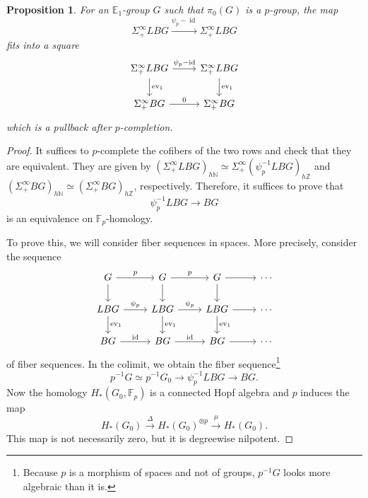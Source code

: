 \documentclass[10pt, oneside]{memoir}
\newtheorem{prop}[thm]{Proposition}
\theoremstyle{definition}
\theoremstyle{remark}
\theoremstyle{plain}
\theoremstyle{definition}
\theoremstyle{remark}
\newcommand{\N}{\mathbb{N}}
\newcommand{\Z}{\mathbb{Z}}
\newcommand{\E}{\mathbb{E}}
\newcommand{\F}{\mathbb{F}}
\newcommand{\on}[1]{\operatorname{#1}}
\newcommand{\1}{\mathbf{1}}
\newcommand{\2}{\mathbf{2}}
\newcommand{\3}{\mathbf{3}}
\DeclareMathOperator{\ev}{ev}
\begin{document}
\begin{prop}
    For an \(\E_1 \)-group \(G \) such that \(\pi_0(G) \) is a \(p \)-group, the map
    \[ \Sigma_+^{\infty} LBG \xrightarrow{\psi_p - \on{id}} \Sigma_+^{\infty} LBG \]
    fits into a square
    \begin{equation*}
    \begin{tikzcd}
        \Sigma_+^{\infty} LBG \ar{r}{\psi_p - \on{id}} \ar{d}{\ev_1} & \Sigma_+^{\infty} LBG \ar{d}{\ev_1} \\
        \Sigma_+^{\infty} BG \ar{r}{0} & \Sigma_+^{\infty} BG
    \end{tikzcd}
    \end{equation*}
    which is a pullback after \(p \)-completion.
\end{prop}

\begin{proof}
    It suffices to \(p \)-complete the cofibers of the two rows and check that they are equivalent. They are given by \((\Sigma_+^{\infty} LBG)_{h\N} \simeq \Sigma_+^{\infty} (\psi_p^{-1} LBG)_{h\Z} \) and \((\Sigma_+^{\infty} BG)_{h\N} \simeq (\Sigma_+^{\infty} BG)_{h\Z} \), respectively. Therefore, it suffices to prove that
    \[ \psi_p^{-1} LBG \to BG \]
    is an equivalence on \(\F_p \)-homology.

    To prove this, we will consider fiber sequences in spaces. More precisely, consider the sequence
    \begin{equation*}
    \begin{tikzcd}
        G \ar{r}{p} \ar{d} & G \ar{r}{p} \ar{d} & G \ar{r} \ar{d} & \cdots \\
        LBG \ar{r}{\psi_p} \ar{d}{\ev_1} & LBG \ar{r}{\psi_p} \ar{d}{\ev_1} & LBG \ar{r} \ar{d}{\ev_1} & \cdots \\
        BG \ar{r}{\on{id}} & BG \ar{r}{\on{id}}  & BG \ar{r} & \cdots
    \end{tikzcd}
    \end{equation*}
    of fiber sequences. In the colimit, we obtain the fiber sequence\footnote{Because \(p \) is a morphism of spaces and not of groups, \(p^{-1}G \) looks more algebraic than it is.}
    \[ p^{-1}G \simeq p^{-1} G_0 \to \psi_p^{-1} LBG \to BG. \]
    Now the homology \(H_*(G_0, \F_p) \) is a connected Hopf algebra and \(p \) induces the map
    \[ H_*(G_0) \xrightarrow{\Delta} H_*(G_0)^{\otimes p} \xrightarrow{\mu} H_*(G_0). \]
    This map is not necessarily zero, but it is degreewise nilpotent.
\end{proof}
\end{document}
